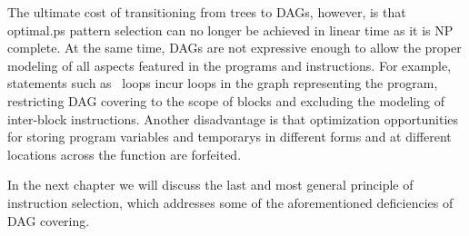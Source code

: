 The ultimate cost of transitioning from \glspl{tree} to \glspl{DAG}, however, is
that \gls{optimal.ps} \gls{pattern selection} can no longer be achieved in
linear time as it is \gls{NP complete}.
%
At the same time, \glspl{DAG} are not
expressive enough to allow the proper modeling of all aspects featured in the
\glspl{program} and \glspl{instruction}.
%
For example, statements such as
\mbox{ loops} incur \glspl{loop} in the \gls{graph} representing
the \gls{program}, restricting \gls{DAG covering} to the scope of \glspl{block}
and excluding the modeling of \glspl{inter-block instruction}.
%
Another
disadvantage is that optimization opportunities for storing \gls{program}
variables and \glspl{temporary} in different forms and at different locations
across the \gls{function} are forfeited.

In the next chapter we will discuss the last and most general \gls{principle} of
\gls{instruction selection}, which addresses some of the aforementioned
deficiencies of \gls{DAG covering}.
